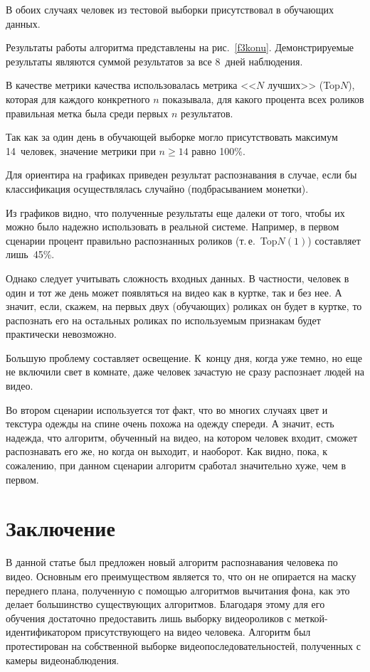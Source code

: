 \begin{multicols}{2}
В обоих случаях человек из тестовой выборки присутствовал в обучающих данных.

Результаты работы алгоритма представлены на рис.~\ref{f3konu}. Демонстрируемые результаты 
являются суммой результатов за все 8~дней наблюдения.

В качестве метрики качества использовалась мет\-ри\-ка <<$N$ лучших>> (Top$N$), которая для 
каждого конкретного $n$ показывала, для какого процента всех роликов правильная метка была 
среди первых $n$ результатов.

Так как за один день в обучающей выборке могло присутствовать максимум 14~человек, 
значение метрики при $n\geq 14$ равно 100\%.

Для ориентира на графиках приведен результат распознавания в случае, если бы классификация 
осуществлялась случайно (подбрасыванием мо\-нетки). 

Из графиков видно, что полученные результаты еще далеки от того, чтобы их можно было 
надежно использовать в реальной системе. Например, в первом сценарии процент правильно 
распознанных роликов (т.\,е.\ Top$N(1)$) составляет лишь~45\%.

Однако следует учитывать сложность входных данных. В частности, человек в один и тот же 
день может появляться на видео как в куртке, так и без нее. А значит, если, скажем, на первых 
двух (обучающих) роликах он будет в куртке, то распознать его на остальных роликах по 
используемым признакам будет практически невозможно.

Большую проблему составляет освещение. К~кон\-цу дня, когда уже темно, но еще не включили 
свет в комнате, даже человек зачастую не сразу распознает людей на видео. 

Во втором сценарии используется тот факт, что во многих случаях цвет и текстура одежды на 
спине очень похожа на одежду спереди. А значит, есть надежда, что алгоритм, обученный на 
видео, на котором человек входит, сможет распознавать его же, но когда он выходит, и наоборот. 
Как видно, пока, к сожалению, при данном сценарии алгоритм сработал значительно хуже, чем в 
первом.

\section{Заключение}

В данной статье был предложен новый алгоритм распознавания человека по видео. Основным 
его преимуществом является то, что он не опирается на маску переднего плана, полученную с 
по\-мощью алгоритмов вычитания фона, как это делает большинство существующих алгоритмов. 
Благодаря этому для его обучения достаточно предоставить лишь выборку видеороликов с 
меткой-идентификатором присутствующего на видео человека. Алгоритм был протестирован 
на собственной выборке видеопоследовательностей, полученных с камеры видеонаблюдения.


\end{multicols}
